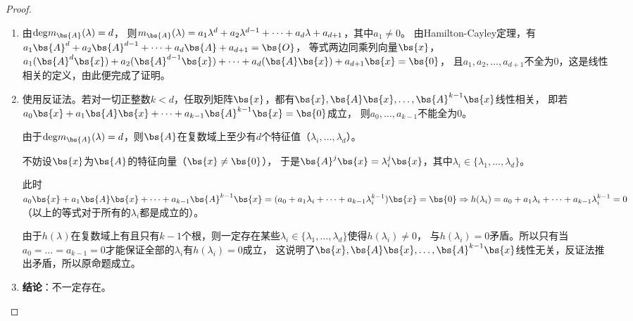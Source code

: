 \documentclass[12pt, a4paper, oneside, UTF8]{ctexbook}
\begin{document}
\begin{proof}
    \begin{enumerate}[label=(\arabic*)]
        \item 由$\mathrm{deg}m_{\bs{A}}(\lambda)=d$，
        则$m_{\bs{A}}(\lambda)=a_1\lambda^d+a_2\lambda^{d-1}+\cdots+a_d\lambda+a_{d+1}$，其中$a_1 \neq 0$。
        由Hamilton-Cayley定理，有$a_1\bs{A}^d+a_2\bs{A}^{d-1}+\cdots+a_d\bs{A}+a_{d+1}=\bs{O}$，
        等式两边同乘列向量$\bs{x}$，$a_1(\bs{A}^d\bs{x})+a_2(\bs{A}^{d-1}\bs{x})+\cdots+a_d(\bs{A}\bs{x})+a_{d+1}\bs{x}=\bs{0}$，
        且$a_1,a_2,\ldots,a_{d+1}$不全为$0$，这是线性相关的定义，由此便完成了证明。
        \item 使用反证法。若对一切正整数$k<d$，任取列矩阵$\bs{x}$，都有$\bs{x},\bs{A}\bs{x},\ldots,\bs{A}^{k-1}\bs{x}$线性相关，
        即若$a_0\bs{x}+a_1\bs{A}\bs{x}+\cdots+a_{k-1}\bs{A}^{k-1}\bs{x}=\bs{0}$成立，
        则$a_0,\ldots,a_{k-1}$不能全为$0$。

        由于$\mathrm{deg}m_{\bs{A}}(\lambda)=d$，则$\bs{A}$在复数域上至少有$d$个特征值（$\lambda_i,\ldots,\lambda_d$）。
        
        不妨设$\bs{x}$为$\bs{A}$的特征向量（$\bs{x}\neq \bs{0}$），
        于是$\bs{A}^j\bs{x}=\lambda^j_i \bs{x}$，其中$\lambda_i \in \{\lambda_1,\ldots,\lambda_d\}$。
        
        此时$a_0\bs{x}+a_1\bs{A}\bs{x}+\cdots+a_{k-1}\bs{A}^{k-1}\bs{x}=
        (a_0+a_1\lambda_i+\cdots+a_{k-1}\lambda_i^{k-1})\bs{x}=\bs{0} \Rightarrow h(\lambda_i)=a_0+a_1\lambda_i+\cdots+a_{k-1}\lambda_i^{k-1}= 0$
        （以上的等式对于所有的$\lambda_i$都是成立的）。

        由于$h(\lambda)$在复数域上有且只有$k-1$个根，则一定存在某些$\lambda_i \in \{\lambda_1,\ldots,\lambda_d\}$使得$h(\lambda_i)\neq 0$，
        与$h(\lambda_i)=0$矛盾。所以只有当$a_0=\ldots=a_{k-1}=0$才能保证全部的$\lambda_i$有$h(\lambda_i)=0$成立，
        这说明了$\bs{x},\bs{A}\bs{x},\ldots,\bs{A}^{k-1}\bs{x}$线性无关，反证法推出矛盾，所以原命题成立。 \label{第二问解答}
        \item \textbf{结论}：不一定存在。
    \end{enumerate}
\end{proof}


\ifx\allfiles\undefined
\end{document}
